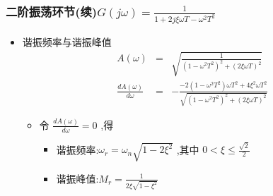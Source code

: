 \documentclass[table]{beamer}
\begin{document}
\begin{frame}
\frametitle{二阶振荡环节(续)$G(j\omega) = \frac{1}{1+2j\xi\omega T-\omega^2 T^2}$}
\label{sec-2-3-3}

\begin{itemize}
\item 谐振频率与谐振峰值
      \begin{eqnarray*}
      A(\omega) &=& \sqrt{\frac{1}{(1-\omega^2 T^2)^2+(2\xi\omega T)^2}}\\
      \frac{dA(\omega)}{d\omega} &=& -\frac{-2(1-\omega^2 T^2)\omega T^2+4\xi^2\omega T^2}{\sqrt{(1-\omega^2 T^2)^2+(2\xi\omega T)^2}}
      \end{eqnarray*}
\begin{itemize}
\item <2-> 令 $\frac{dA(\omega)}{d\omega}=0$ ,得
\begin{itemize}
\item 谐振频率:$\omega_r=\omega_n\sqrt{1-2\xi^2}$ ,其中 $0<\xi\leq\frac{\sqrt{2}}{2}$
\item 谐振峰值:$M_r=\frac{1}{2\xi\sqrt{1-\xi^2}}$
\end{itemize}
\end{itemize}
\end{itemize}
\end{frame}
\end{document}
